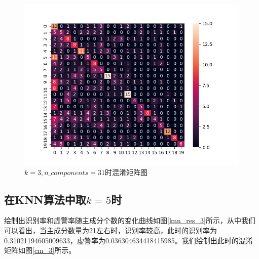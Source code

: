 \documentclass[cn]{elegantbook}
\begin{document}
\begin{figure}[!h]
	\centering
	\includegraphics[width=0.9\linewidth]{../results/cm_3}
	\caption{\label{cm_2}$k=3, n\_components=31$时混淆矩阵图}
\end{figure}

\subsection{在KNN算法中取$k=5$时}
绘制出识别率和虚警率随主成分个数的变化曲线如图\ref{knn_res_3}所示，从中我们可以看出，当主成分数量为21左右时，识别率较高，此时的识别率为0.31021194605009633，虚警率为0.036304634418415985。我们绘制出此时的混淆矩阵如图\ref{cm_3}所示。
\end{document}
